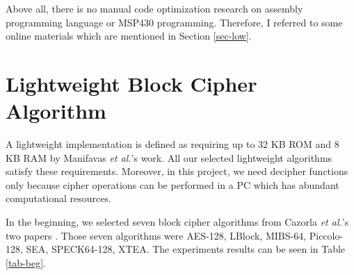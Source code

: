 \documentclass[sigconf, review=false]{acmart}
\begin{document}
Above all, there is no manual code optimization research
on assembly programming language or MSP430 programming.
Therefore, I referred to some online materials which are mentioned in Section \ref{sec-low}.


\section{Lightweight Block Cipher Algorithm} \label{sec-block}

A lightweight implementation is defined as requiring up to 32 KB ROM and 8 KB RAM by Manifavas \textit{et al.}'s work\cite{manifavas2014lightweight}.
All our selected lightweight algorithms satisfy these requirements.
Moreover, in this project, we need decipher functions only because cipher operations can be performed in a PC which has abundant computational resources.

In the beginning, we selected seven block cipher algorithms from Cazorla \textit{et al.}'s two papers \cite{cazorla2013survey, cazorla2015survey}.
Those seven algorithms were AES-128\cite{pub2001197}, LBlock\cite{wu2011lblock}, MIBS-64\cite{izadi2009mibs},
Piccolo-128\cite{shibutani2011piccolo}, SEA\cite{standaert2006sea}, SPECK64-128\cite{beaulieu2015simon}, XTEA\cite{needham1997tea, wheeler1998correction}.
The experiments results can be seen in Table \ref{tab-beg}.
\end{document}

